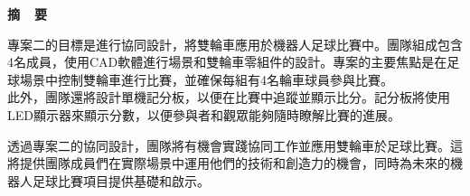 \renewcommand{\baselinestretch}{1.5} %
\clearpage  %
\sectionef
{} %
\begin{center}
\LARGE\textbf{摘~~要}\\
\end{center}
\begin{flushleft}
\fontsize{14pt}{20pt}\sectionef\hspace{12pt}\quad 專案二的目標是進行協同設計，將雙輪車應用於機器人足球比賽中。團隊組成包含4名成員，使用CAD軟體進行場景和雙輪車零組件的設計。專案的主要焦點是在足球場景中控制雙輪車進行比賽，並確保每組有4名輪車球員參與比賽。\\[12pt]

\fontsize{14pt}{20pt}\sectionef\hspace{12pt}\quad 此外，團隊還將設計單機記分板，以便在比賽中追蹤並顯示比分。記分板將使用LED顯示器來顯示分數，以便參與者和觀眾能夠隨時瞭解比賽的進展。\\[12pt]

\end{flushleft}
\begin{center}
\fontsize{14pt}{20pt}\selectfont 透過專案二的協同設計，團隊將有機會實踐協同工作並應用雙輪車於足球比賽。這將提供團隊成員們在實際場景中運用他們的技術和創造力的機會，同時為未來的機器人足球比賽項目提供基礎和啟示。
\end{center}
\newpage
\renewcommand{\baselinestretch}{1.5} %
